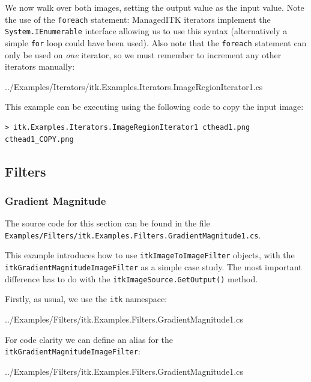 \documentclass{InsightArticle}
\def\code#1{\texttt{#1}}
\begin{document}
We now walk over both images, setting the output value as the input value.
Note the use of the \code{foreach} statement: ManagedITK iterators implement
the \code{System.IEnumerable} interface allowing us to use this syntax
(alternatively a simple \code{for} loop could have been used).
Also note that the \code{foreach} statement can only be used on \emph{one}
iterator, so we must remember to increment any other iterators manually:
\begin{center}
	
	{../Examples/Iterators/itk.Examples.Iterators.ImageRegionIterator1.cs}
\end{center}

This example can be executing using the following code to copy the input image:
\begin{lstlisting}
> itk.Examples.Iterators.ImageRegionIterator1 cthead1.png cthead1_COPY.png
\end{lstlisting}

\subsection{Filters}

\subsubsection{Gradient Magnitude}
The source code for this section can be found in the file\\
\code{Examples/Filters/itk.Examples.Filters.GradientMagnitude1.cs}.

This example introduces how to use \code{itkImageToImageFilter} objects, 
with the \code{itkGradientMagnitudeImageFilter} as a simple case study.
The most important difference has to do with the \code{itkImageSource.GetOutput()}
method.

Firstly, as usual, we use the \code{itk} namespace:
\begin{center}
	
	{../Examples/Filters/itk.Examples.Filters.GradientMagnitude1.cs}
\end{center}

For code clarity we can define an alias for the \code{itk\-Gradient\-Magnitude\-ImageFilter}:
\begin{center}
	
	{../Examples/Filters/itk.Examples.Filters.GradientMagnitude1.cs}
\end{center}
\end{document}
